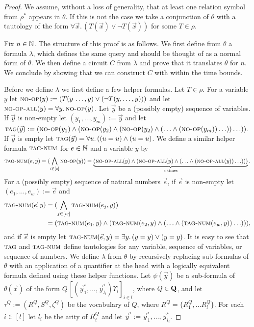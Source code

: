 \documentclass[../main/thesis.tex]{subfiles}
\begin{document}
\begin{proof}
  We assume, without a loss of generality, that at least one relation symbol
  from $\rho^*$ appears in $\theta$. If this is not the case we take a
  conjunction of $\theta$ with a tautology of the form $\forall \vec{x}. \,
  (T(\vec{x}) \lor \neg T(\vec{x}))$ for some $T \in \rho$.

  Fix $n \in \mathbb{N}$. The structure of this proof is as follows. We first define
  from $\theta$ a formula $\lambda$, which defines the same query and should be
  thought of as a normal form of $\theta$. We then define a circuit $C$ from
  $\lambda$ and prove that it translates $\theta$ for $n$. We conclude by
  showing that we can construct $C$ with within the time bounds.

  Before we define $\lambda$ we first define a few helper formulas. Let $T \in
  \rho$. For a variable $y$ let ${\normalfont\textsc{no-op}}(y) := (T(y \, \dots, y) \lor (\neg
  T(y , \ldots, y)))$ and let ${\normalfont\textsc{no-op-all}}(y) = \forall y .\, {\normalfont\textsc{no-op}}(y)$.
  Let $\vec{y}$ be a (possibly empty) sequence of variables. If $\vec{y}$ is
  non-empty let $(y_1, \ldots, y_m) := \vec{y}$ and let ${\normalfont\textsc{tag}} (\vec{y}) :=
  ({\normalfont\textsc{no-op}}(y_1) \land ({\normalfont\textsc{no-op}}(y_2) \land ( {\normalfont\textsc{no-op}}(y_2) \land ( \ldots
  \land ({\normalfont\textsc{no-op}}(y_m)) \ldots))\ldots ))$. If $\vec{y}$ is empty let
  ${\normalfont\textsc{tag}} (\vec{y}) = \forall u .\, ((u = u) \land (u = u)$. We define a
  similar helper formula ${\normalfont\textsc{tag-num}}$ for $e \in \mathbb{N}$ and a variable $y$ by
  \begin{align*}
    {\normalfont\textsc{tag-num}}(e, y) = (\bigwedge_{i \in [e]}{\normalfont\textsc{no-op}}(y)) = \underbrace{({\normalfont\textsc{no-op-all}}(y) \land ({\normalfont\textsc{no-op-all}}(y) \land (\ldots \land ({\normalfont\textsc{no-op-all}}(y)) \ldots )))}_{e \text{ times}}.
  \end{align*}
  For a (possibly empty) sequence of natural numbers $\vec{e}$, if $\vec{e}$ is
  non-empty let $ (e_1, \ldots, e_w) := \vec{e}$ and
  \begin{align*}
    {\normalfont\textsc{tag-num}}(\vec{e}, y) &= (\bigwedge_{j \in [w]}{\normalfont\textsc{tag-num}}(e_j, y)) \\&= ({\normalfont\textsc{tag-num}}(e_1 , y) \land ({\normalfont\textsc{tag-num}}(e_2, y) \land ( \ldots  \land ({\normalfont\textsc{tag-num}}(e_w, y)) \ldots ))), 
  \end{align*}
  and if $\vec{e}$ is empty let ${\normalfont\textsc{tag-num}}(\vec{e}, y) = \exists y. \, (y =
  y) \lor (y = y)$. It is easy to see that ${\normalfont\textsc{tag}}$ and ${\normalfont\textsc{tag-num}}$ define
  tautologies for any variable, sequence of variables, or sequence of numbers.
  We define $\lambda$ from $\theta$ by recursively replacing sub-formulas of
  $\theta$ with an application of a quantifier at the head with a logically
  equivalent formula defined using these helper functions. Let $\psi (\vec{y})$
  be a sub-formula of $\theta (\vec{x})$ of the form $Q\,[(\vec{y}^i_1, \ldots,
  \vec{y}^i_{l_i}) \Upsilon_i]_{i \in l}$, where $Q \in \mathbf{Q}$, and let
  $\tau^Q := (R^{Q}, S^{Q}, \zeta^{Q})$ be the vocabulary of $Q$, where $R^{Q} =
  \{R^{Q}_1, \ldots R^{Q}_l\}$. For each $i \in [l]$ let $l_i$ be the arity of
  $R^{Q}_i$ and let $\vec{y}^i := \vec{y}^i_1, \ldots, \vec{y}^i_{l_i}$.


\end{proof}
\end{document}
